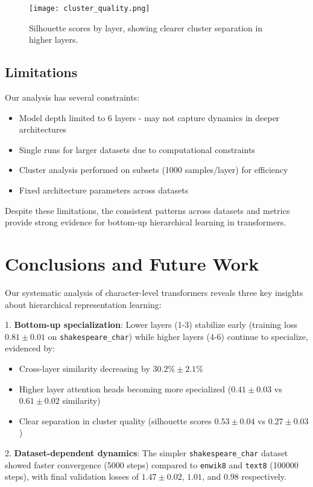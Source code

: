 \documentclass{article} %
\begin{document}
\begin{figure}[h]
    \centering
    \texttt{[image: cluster\_quality.png]}
    \caption{Silhouette scores by layer, showing clearer cluster separation in higher layers.}
    \label{fig:clusters}
\end{figure}

\subsection{Limitations}
Our analysis has several constraints:
\begin{itemize}
    \item Model depth limited to 6 layers - may not capture dynamics in deeper architectures
    \item Single runs for larger datasets due to computational constraints
    \item Cluster analysis performed on subsets (1000 samples/layer) for efficiency
    \item Fixed architecture parameters across datasets
\end{itemize}

Despite these limitations, the consistent patterns across datasets and metrics provide strong evidence for bottom-up hierarchical learning in transformers.

\section{Conclusions and Future Work}
\label{sec:conclusion}

Our systematic analysis of character-level transformers reveals three key insights about hierarchical representation learning:

1. \textbf{Bottom-up specialization}: Lower layers (1-3) stabilize early (training loss $0.81 \pm 0.01$ on \texttt{shakespeare\_char}) while higher layers (4-6) continue to specialize, evidenced by:
\begin{itemize}
    \item Cross-layer similarity decreasing by $30.2\% \pm 2.1\%$
    \item Higher layer attention heads becoming more specialized ($0.41 \pm 0.03$ vs $0.61 \pm 0.02$ similarity)
    \item Clear separation in cluster quality (silhouette scores $0.53 \pm 0.04$ vs $0.27 \pm 0.03$)
\end{itemize}

2. \textbf{Dataset-dependent dynamics}: The simpler \texttt{shakespeare\_char} dataset showed faster convergence (5000 steps) compared to \texttt{enwik8} and \texttt{text8} (100000 steps), with final validation losses of $1.47 \pm 0.02$, $1.01$, and $0.98$ respectively.
\end{document}
